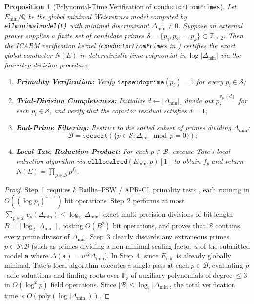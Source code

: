 \documentclass[10pt,a4paper]{article}
\theoremstyle{plain}
\newtheorem{proposition}[theorem]{Proposition}
\theoremstyle{definition}
\theoremstyle{remark}
\begin{document}
\begin{proposition}[Polynomial-Time Verification of \texttt{conductorFromPrimes}]\label{prop:tate_complexity}
Let $E_{\min}/\mathbb{Q}$ be the global minimal Weierstrass model computed by \texttt{ellminimalmodel(E)} with minimal discriminant $\Delta_{\min} \neq 0$. Suppose an external prover supplies a finite set of candidate primes $\mathcal{S} = \{p_1, p_2, \dots, p_k\} \subset \mathbb{Z}_{\ge 2}$. Then the ICARM verification kernel (\texttt{conductorFromPrimes} in \cite{icarm2026leaderboard}) certifies the exact global conductor $N(E)$ in deterministic time polynomial in $\log |\Delta_{\min}|$ via the four-step decision procedure:
\begin{enumerate}[noitemsep,leftmargin=2em]
    \item \textbf{Primality Verification:} Verify $\mathtt{ispseudoprime}(p_i) = 1$ for every $p_i \in \mathcal{S}$;
    \item \textbf{Trial-Division Completeness:} Initialize $d \leftarrow |\Delta_{\min}|$, divide out $p_i^{v_{p_i}(d)}$ for each $p_i \in \mathcal{S}$, and verify that the cofactor residual satisfies $d = 1$;
    \item \textbf{Bad-Prime Filtering:} Restrict to the sorted subset of primes dividing $\Delta_{\min}$:
    \begin{equation}
    \mathcal{B} = \mathtt{vecsort}\!\left(\{p \in \mathcal{S} : \Delta_{\min} \bmod p = 0\}\right);
    \end{equation}
    \item \textbf{Local Tate Reduction Product:} For each $p \in \mathcal{B}$, execute Tate's local reduction algorithm \cite{tate1975algorithm} via $\mathtt{elllocalred}(E_{\min}, p)[1]$ to obtain $f_p$ and return $N(E) = \prod_{p \in \mathcal{B}} p^{f_p}$.
\end{enumerate}
\end{proposition}

\begin{proof}
Step~1 requires $k$ Baillie--PSW / APR-CL primality tests \cite{cohen1984primality}, each running in $O((\log p_i)^{4+\varepsilon})$ bit operations. Step~2 performs at most $\sum_{p \in \mathcal{B}} v_p(\Delta_{\min}) \le \log_2 |\Delta_{\min}|$ exact multi-precision divisions of bit-length $B = \lceil \log_2 |\Delta_{\min}| \rceil$, costing $O(B^2)$ bit operations, and proves that $\mathcal{B}$ contains every prime divisor of $\Delta_{\min}$. Step~3 cleanly discards any extraneous primes $p \in \mathcal{S} \setminus \mathcal{B}$ (such as primes dividing a non-minimal scaling factor $u$ of the submitted model $\mathbf{a}$ where $\Delta(\mathbf{a}) = u^{12}\Delta_{\min}$). In Step~4, since $E_{\min}$ is already globally minimal, Tate's local algorithm \cite{cremona1997algorithms,tate1975algorithm} executes a single pass at each $p \in \mathcal{B}$, evaluating $p$-adic valuations and finding roots over $\mathbb{F}_p$ of auxiliary polynomials of degree $\le 3$ in $O(\log^2 p)$ field operations. Since $|\mathcal{B}| \le \log_2 |\Delta_{\min}|$, the total verification time is $O(\mathrm{poly}(\log |\Delta_{\min}|))$.
\end{proof}
\end{document}
